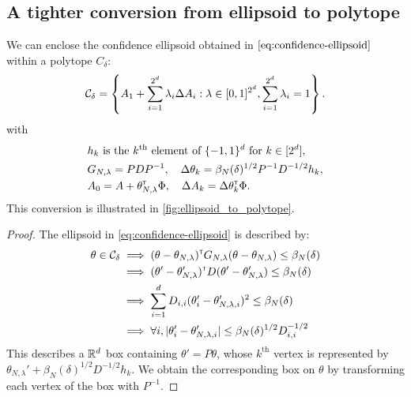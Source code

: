 \begin{subappendices}
	\section{A tighter conversion from ellipsoid to polytope}
	\label{sec:tight-polytope}
	\begin{lemma}
		\label{lem:tight_polytope}
		We can enclose the confidence ellipsoid obtained in $\eqref{eq:confidence-ellipsoid}$ within a polytope $C_\delta$:
		\begin{equation}
		\mathcal{C}_\delta = \left\{ A_{1}+\sum_{i=1}^{2^d}\lambda_{i}\Delta A_{i}: \lambda\in[0, 1]^{2^d},  \sum_{i=1}^{2^d}\lambda_{i}=1\right\}.
		\end{equation}
		with 
		\begin{align*}
		&h_k \text{ is the }k^\text{th}\text{ element of }\{-1,1\}^d\text{ for } k\in[2^d],\\
		&G_{N,\lambda} = PDP^{-1}, \quad \Delta\theta_k = \beta_{N}(\delta)^{1/2} P^{-1}D^{-1/2} h_k, \\
		&A_0 = A + \theta_{N,\lambda}^{\mathsf{\scriptscriptstyle T}}\Phi, \quad \Delta A_k = \Delta\theta_k^{\mathsf{\scriptscriptstyle T}}\Phi.
		\end{align*}
		This conversion is illustrated in \autoref{fig:ellipsoid_to_polytope}.
	\end{lemma}
	
	\begin{proof}
		The ellipsoid in \eqref{eq:confidence-ellipsoid} is described by:
		\begin{align*}
		\theta\in\mathcal{C}_\delta &\implies
		(\theta-\theta_{N,\lambda})^{\mathsf{\scriptscriptstyle T}} G_{N,\lambda}(\theta-\theta_{N,\lambda}) \leq \beta_{N}(\delta)\\
		&\implies (\theta'-\theta'_{N,\lambda})^{\mathsf{\scriptscriptstyle T}} D (\theta'-\theta'_{N,\lambda}) \leq \beta_{N}(\delta)\\
		&\implies \sum_{i=1}^d D_{i,i}(\theta'_i-\theta'_{N,\lambda,i})^2\leq \beta_{N}(\delta)\\
		&\implies\forall i, |\theta'_i-\theta'_{N,\lambda,i}|\leq \beta_{N}(\delta)^{1/2}D_{i,i}^{-1/2}
		\end{align*}
		This describes a $\mathbb{R}^d$ box containing $\theta' = P\theta$, whose $k^\text{th}$ vertex is represented by $\theta_{N,\lambda}' + \beta_{N}(\delta)^{1/2}D^{-1/2} h_k$. We obtain the corresponding box on $\theta$ by transforming each vertex of the box with $P^{-1}$.
	\end{proof}
	

\end{subappendices}
